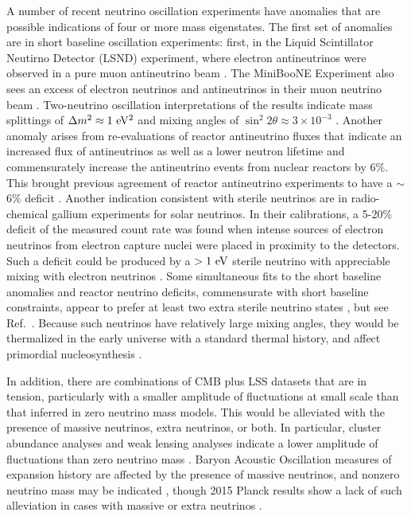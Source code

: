 A number of recent neutrino oscillation experiments have anomalies
that are possible indications of four or more mass eigenstates. The
first set of anomalies are in short baseline oscillation experiments:
first, in the Liquid Scintillator Neutirno Detector (LSND) experiment,
where electron antineutrinos were observed in a pure muon antineutrino
beam \cite{Athanassopoulos:1997pv}. The MiniBooNE Experiment also sees
an excess of electron neutrinos and antineutrinos in their muon
neutrino beam \cite{Aguilar-Arevalo:2013pmq}. Two-neutrino oscillation
interpretations of the results indicate mass splittings of $\Delta m^2
\approx 1\rm\ eV^2$ and mixing angles of $\sin^2 2\theta \approx
3\times 10^{-3}$ \cite{Aguilar-Arevalo:2013pmq}. Another anomaly
arises from re-evaluations of reactor antineutrino fluxes that
indicate an increased flux of antineutrinos as well as a lower
neutron lifetime and commensurately increase the antineutrino events
from nuclear reactors by 6\%. This brought previous agreement of
reactor antineutrino experiments to have a $\sim$6\% deficit
\cite{Mention:2011rk,Huber:2011wv}. Another indication consistent with
sterile neutrinos are in radio-chemical gallium experiments for solar
neutrinos. In their calibrations, a 5-20\% deficit of the measured
count rate was found when intense sources of electron neutrinos from
electron capture nuclei were placed in proximity to the
detectors. Such a deficit could be produced by a $>1\rm\ eV$ sterile
neutrino with appreciable mixing with electron neutrinos
\cite{Bahcall:1994bq,Giunti:2010zu}. Some simultaneous fits to the
short baseline anomalies and reactor neutrino deficits, commensurate
with short baseline constraints, appear to prefer at least two extra
sterile neutrino states \cite{Conrad:2012qt,Kopp:2013vaa}, but see
Ref.~\cite{Giunti:2015mwa}. Because such neutrinos have relatively
large mixing angles, they would be thermalized in the early universe
with a standard thermal history, and affect primordial nucleosynthesis
\cite{Abazajian:2002bj}. 

In addition, there are combinations of CMB plus LSS
datasets that are in tension, particularly with a smaller amplitude of
fluctuations at small scale than that inferred in zero neutrino mass
models. This would be alleviated with the
presence of massive neutrinos, extra neutrinos, or both. In particular,
cluster abundance analyses \cite{Wyman:2013lza,Ade:2015fva} and weak lensing analyses
\cite{Battye:2013xqa} indicate a lower amplitude of
fluctuations than zero neutrino mass \cite{Giusarma:2014zza}. Baryon Acoustic
Oscillation measures of expansion history are affected by the presence
of massive neutrinos, and nonzero neutrino mass may be indicated 
\cite{Beutler:2014yhv}, though 2015 Planck results show a lack of such
alleviation in cases with massive or extra neutrinos
\cite{Ade:2015xua}. 

